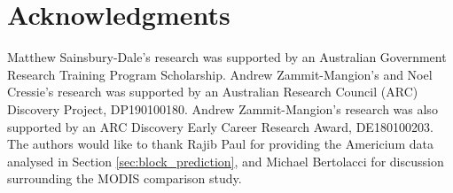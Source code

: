 \documentclass[article]{jss}
\begin{document}
\section*{Acknowledgments}

Matthew Sainsbury-Dale's research was supported by an Australian Government Research Training Program Scholarship.
Andrew Zammit-Mangion's and Noel Cressie's research was supported by an Australian Research Council (ARC) Discovery Project, DP190100180. Andrew Zammit-Mangion's research was also supported by an ARC Discovery Early Career Research Award, DE180100203.  
The authors would like to thank Rajib Paul for providing the Americium data analysed in Section \ref{sec:block_prediction}, 
and Michael Bertolacci for discussion surrounding the MODIS comparison study.















\end{document}

